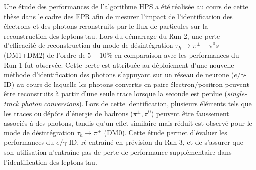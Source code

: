 Une étude des performances de l'algorithme HPS a été réalisée au cours de cette thèse dans le cadre des EPR afin de mesurer l'impact de l'identification des électrons et des photons reconstruits par le flux de particules sur la reconstruction des leptons tau. Lors du démarrage du Run 2, une perte d'efficacité de reconstruction du mode de désintégration $\tau_h\rightarrow\pi^{\pm}+\pi^0s$ (DM1+DM2) de l'ordre de $5-10\%$ en comparaison avec les performances du Run 1 fut observée. Cette perte est attribuée au déploiement d'une nouvelle méthode d'identification des photons s'appuyant sur un réseau de neurone ($e/\gamma$-ID) au cours de laquelle les photons convertis en paire électron/positron peuvent être reconstruits à partir d'une seule trace lorsque la seconde est perdue (\textit{single-track photon conversions}). Lors de cette identification, plusieurs éléments tels que les traces ou dépôts d'énergie de hadrons ($\pi^{\pm},\pi^0$) peuvent être faussement associés à des photons, tandis qu'un effet similaire mais réduit est observé pour le mode de désintégration $\tau_h\rightarrow\pi^{\pm}$ (DM0). Cette étude permet d'évaluer les performances du $e/\gamma$-ID, ré-entraîné en prévision du Run 3, et de s'assurer que son utilisation n'entraîne pas de perte de performance supplémentaire dans l'identification des leptons tau. \\

